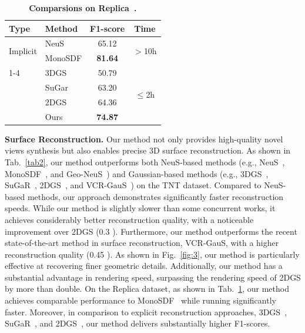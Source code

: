 \begin{table}
    \small
    \vspace{-0.4cm}
    \centering
    \caption{\textbf{Comparsions on Replica~\cite{replica}.}} %
    \label{tab:3}
    \renewcommand{\arraystretch}{0.9}
    \setlength{\tabcolsep}{6pt}
    \begin{tabular}{llcc}
    \toprule
    \textbf{Type} & \textbf{Method} & \textbf{F1-score} & \textbf{Time} \\
    \midrule
    \multirow{2}{*}{Implicit}
      & NeuS      & 65.12 & \multirow{2}{*}{$>$10h} \\
      & MonoSDF   & \textbf{81.64} & \\
    \cmidrule{1-4}
    \multirow{4}{*}{Explicit}
      & 3DGS      & 50.79 & \multirow{4}{*}{$\leq$2h} \\
      & SuGar     & 63.20 & \\
      & 2DGS      & 64.36 & \\
      & Ours      & \textbf{74.87} & \\
    \bottomrule
    \end{tabular}
    \vspace{-0.4cm}
\end{table}

\noindent\textbf{Surface Reconstruction.}
Our method not only provides high-quality novel views synthesis but also enables precise 3D surface reconstruction. 
As shown in Tab.~\ref{tab2}, our method outperforms both NeuS-based methods (e.g., NeuS~\cite{NeuS}, MonoSDF~\cite{MonoSDF}, and Geo-NeuS~\cite{Geo-Neus}) and Gaussian-based methods (e.g., 3DGS~\cite{3dgs}, SuGaR~\cite{SuGaR}, 2DGS~\cite{2Dgs}, and VCR-GauS~\cite{vcr-gaus}) on the TNT dataset. Compared to NeuS-based methods, our approach demonstrates significantly faster reconstruction speeds. While our method is slightly slower than some concurrent works, it achieves considerably better reconstruction quality, with a noticeable improvement over 2DGS (0.3 ). Furthermore, our method outperforms the recent state-of-the-art method in surface reconstruction, VCR-GauS, with a higher reconstruction quality (0.45 ). As shown in Fig.~\ref{fig:3}, our method is particularly effective at recovering finer geometric details. Additionally, our method has a substantial advantage in rendering speed, surpassing the rendering speed of 2DGS by more than double.
On the Replica dataset, as shown in Tab.~\ref{tab:3},
our method achieves comparable performance to MonoSDF~\cite{MonoSDF} while running significantly faster. 
Moreover, in comparison to explicit reconstruction approaches, 3DGS~\cite{3dgs}, SuGaR~\cite{SuGaR}, and 2DGS~\cite{2Dgs}, our method delivers substantially higher F1-scores.





